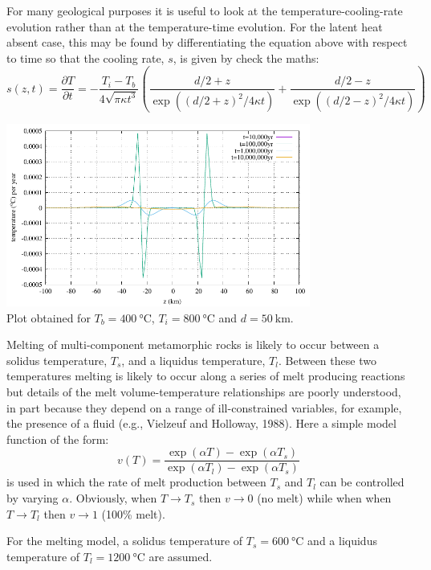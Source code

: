 For many geological purposes it is useful to look at the
temperature-cooling-rate evolution rather than at
the temperature-time evolution. For the latent
heat absent case, this may be found by differentiating the equation above 
with respect to time so that the cooling rate, $s$, is given by {\color{red} check the maths}:
\[
s(z,t) = \frac{\partial T}{\partial t}
=-\frac{T_i-T_b}{4\sqrt{\pi \kappa t^3}}
\left(
\frac{d/2 +z}{\exp((d/2+z)^2/4\kappa t )}
+
\frac{d/2 -z}{\exp((d/2-z)^2/4\kappa t )}
\right)
\]

\begin{center}
\includegraphics[width=10cm]{python_codes/fieldstone_169/images/solution_derv.pdf}\\
{\captionfont Plot obtained for $T_b=400~\si{\celsius}$, $T_i=800~\si{\celsius}$ and $d=50~\si{\km}$.}
\end{center}


Melting of multi-component metamorphic rocks is likely to occur between a solidus
temperature, $T_s$, and a liquidus temperature, $T_l$.
Between these two temperatures melting is likely
to occur along a series of melt producing reactions but details of the melt volume-temperature
relationships are poorly understood, in part because they depend on a range of ill-constrained
variables, for example, the presence of a fluid
(e.g., Vielzeuf and Holloway, 1988). Here a simple model function of the form:
\begin{equation}
v(T) = \frac{\exp(\alpha T)- \exp(\alpha T_s) }{\exp(\alpha T_l) - \exp(\alpha T_s) }
\label{eq:stuw95_eq3}
\end{equation}
is used in which the rate of melt production between $T_s$ and $T_l$ can be controlled by varying $\alpha$.
Obviously, when $T\rightarrow T_s$ then $v \rightarrow 0$ (no melt) while when
when $T\rightarrow T_l$ then $v \rightarrow 1$ (100\% melt).


For the melting model, a solidus temperature of $T_s=600~\si{\celsius}$ and a 
liquidus temperature of $T_l = 1200~\si{\celsius}$ are assumed.


